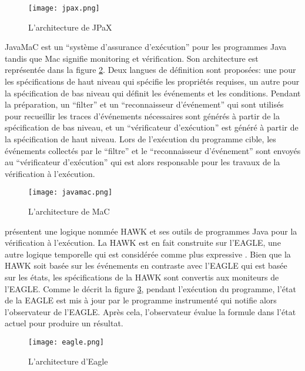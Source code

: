 \begin{figure}[h]
\begin{center}
\centering
\texttt{[image: jpax.png]}
\caption{L'architecture de JPaX \citep{havelund2001java}}
\label{img:jpax}
\end{center}
\end{figure}

JavaMaC \citep{kim2004java} est un ``système d'assurance d'exécution'' pour les programmes Java tandis que Mac signifie monitoring et vérification. Son architecture est représentée dans la figure \ref{img:javamac}. Deux langues de définition sont proposées: une pour les spécifications de haut niveau qui spécifie les propriétés requises, un autre pour la spécification de bas niveau qui définit les événements et les conditions. Pendant la préparation, un ``filter'' et un ``reconnaisseur d'événement'' qui sont utilisés pour recueillir les traces d'événements nécessaires sont générés à partir de la spécification de bas niveau, et un ``vérificateur d'exécution'' est généré à partir de la spécification de haut niveau. Lors de l'exécution du programme cible, les événements collectés par le ``filtre'' et le ``reconnaisseur d'événement'' sont envoyés au ``vérificateur d'exécution'' qui est alors responsable pour les travaux de la vérification à l'exécution.

\begin{figure}[h]
\begin{center}
\centering
\texttt{[image: javamac.png]}
\caption{L'architecture de MaC \citep{kim2004java}}
\label{img:javamac}
\end{center}
\end{figure}

\cite{d2005event} présentent une logique nommée HAWK et ses outils de programmes Java pour la vérification à l'exécution. La HAWK est en fait construite sur l'EAGLE, une autre logique temporelle qui est considérée comme plus expressive \citep{barringer2004rule}. Bien que la HAWK soit basée sur les événements en contraste avec l'EAGLE qui est basée sur les états, les spécifications de la HAWK sont convertis aux moniteurs de l'EAGLE. Comme le décrit la figure \ref{img:eagle}, pendant l'exécution du programme, l'état de la EAGLE est mis à jour par le programme instrumenté qui notifie alors l'observateur de l'EAGLE. Après cela, l'observateur évalue la formule dans l'état actuel pour produire un résultat.

\begin{figure}[h]
\begin{center}
\centering
\texttt{[image: eagle.png]}
\caption{L'architecture d'Eagle \citep{d2005event}}
\label{img:eagle}
\end{center}
\end{figure}

